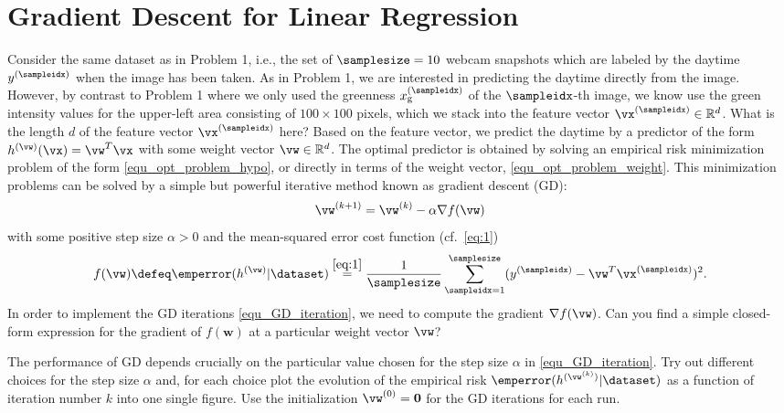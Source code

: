 \documentclass[article,11pt]{article}
\begin{document}
\section{Gradient Descent for Linear Regression}
Consider the same dataset as in Problem 1, i.e., the set of $\samplesize=10$ webcam snapshots which are labeled by the daytime $y^{(\sampleidx)}$ 
when the image has been taken. As in Problem 1, we are interested in predicting the daytime directly from the image. However, by contrast 
to Problem 1 where we only used the greenness $x_{\rm g}^{(\sampleidx)}$ of the $\sampleidx$-th image, we know use the green intensity 
values for the upper-left area consisting of $100 \times 100$ pixels, 
which we stack into the feature vector $\vx^{(\sampleidx)} \in \mathbb{R}^{d}$. What is the length $d$ of the feature vector $\vx^{(\sampleidx)}$ here? 
Based on the feature vector, we predict the daytime by a predictor of the form $h^{(\vw)}(\vx) = \vw^{T} \vx$ with some weight vector $\vw \in \mathbb{R}^{d}$. 
The optimal predictor is obtained by solving an empirical risk minimization problem of the form \eqref{equ_opt_problem_hypo}, 
or directly in terms of the weight vector, \eqref{equ_opt_problem_weight}. This minimization problems can be solved by a simple but powerful iterative method 
known as gradient descent (GD): 
\vspace*{-2mm}
\begin{equation}
\label{equ_GD_iteration}
    \vw^{(k+1)} = \vw^{(k)} - \alpha \nabla f(\vw) 
 \vspace*{-2mm}
\end{equation}
with some positive step size $\alpha >0$ and the mean-squared error cost function (cf.\ \eqref{eq:1}) 
\vspace*{-2mm}
\begin{equation} 
f(\vw) \defeq \emperror(h^{(\vw)}|\dataset) \stackrel{\eqref{eq:1}}{=} \frac{1}{\samplesize}\sum^{\samplesize}_{\sampleidx=1}(y^{(\sampleidx)} - \vw^{T} \vx^{(\sampleidx)})^2. \nonumber
\vspace*{-2mm}
\end{equation} 
In order to implement the GD iterations \eqref{equ_GD_iteration}, we need to compute the gradient $\nabla f(\vw)$. 
Can you find a simple closed-form expression for the gradient of $f(\mathbf{w})$ at a particular weight vector $\vw$?

The performance of GD depends crucially on the particular value chosen for the step size $\alpha$ in \eqref{equ_GD_iteration}. 
Try out different choices for the step size $\alpha$ and, for each choice plot the evolution of the empirical risk 
$\emperror(h^{(\vw^{(k)})}| \dataset)$ as a function of iteration number $k$ into one single figure. 
Use the initialization $\vw^{(0)} = \mathbf{0}$ for the GD iterations for each run. 
\end{document}
